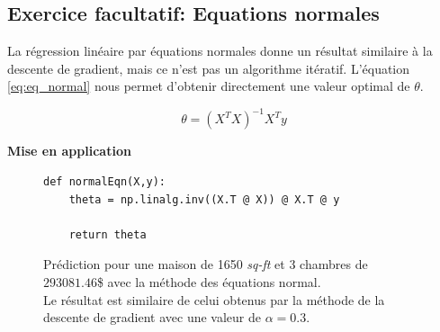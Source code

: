 \subsection{Exercice facultatif: Equations normales}

La régression linéaire par équations normales donne un résultat similaire à la descente de gradient, mais ce n'est pas un algorithme itératif. L'équation \ref{eq:eq_normal} nous permet d'obtenir directement une 
valeur optimal de $\theta$.

\begin{equation}\label{eq:eq_normal}
    \theta = (X^T X)^{-1} X^T y
\end{equation}  


\vspace{.5cm}
\noindent
\textbf{Mise en application}
\vspace{.2cm}


\begin{figure}[!h]
    \begin{minipage}{.48\linewidth}
\begin{verbatim}
def normalEqn(X,y):
    theta = np.linalg.inv((X.T @ X)) @ X.T @ y

    return theta
\end{verbatim}   
\label{listing:normalEqn}
    \end{minipage}\hfill
    \begin{minipage}{.48\linewidth}
        Prédiction pour une maison de 1650 \textit{sq-ft} et 3 chambres de $293081.46$\$ avec la méthode des équations normal. \\
        Le résultat est similaire de celui obtenus par la méthode de la descente de gradient avec une valeur de $\alpha = 0.3$.
    \end{minipage}
\end{figure}
